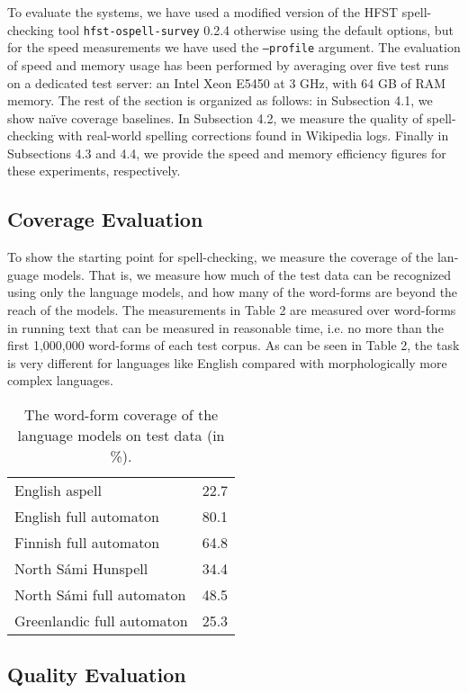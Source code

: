 \documentclass[postprint]{flammie}
\begin{document}
To evaluate the systems, we have used a modified version of the HFST
spell-checking tool \texttt{hfst-ospell-survey} 0.2.4 otherwise using the
default options, but for the speed measurements we have used the
\texttt{--profile} argument.  The evaluation of speed and memory usage has been
performed by averaging over five test runs on a dedicated test server: an Intel
Xeon E5450 at 3 GHz, with 64 GB of RAM memory. The rest of the section is
organized as follows: in Subsection 4.1, we show naïve coverage baselines.  In
Subsection 4.2, we measure the quality of spell-checking with real-world
spelling corrections found in Wikipedia logs. Finally in Subsections 4.3 and
4.4, we provide the speed and memory efficiency figures for these experiments,
respectively.

\subsection{Coverage Evaluation}

To show the starting point for spell-checking, we measure the coverage of the
lan- guage models. That is, we measure how much of the test data can be
recognized using only the language models, and how many of the word-forms are
beyond the reach of the models. The measurements in Table 2 are measured over
word-forms in running text that can be measured in reasonable time, i.e. no
more than the first 1,000,000 word-forms of each test corpus. As can be seen in
Table 2, the task is very different for languages like English compared with
morphologically more complex languages.

\begin{table}
    \caption{The word-form coverage of the language models on test data (in \%).}
        \begin{tabular}{lr}
            English aspell & 22.7 \\
            English full automaton & 80.1 \\
            Finnish full automaton & 64.8 \\
            North Sámi Hunspell & 34.4 \\
            North Sámi full automaton & 48.5 \\
            Greenlandic full automaton & 25.3 \\
        \end{tabular}
\end{table}

\subsection{Quality Evaluation}
\end{document}
